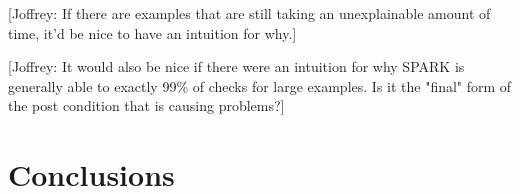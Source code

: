 \documentclass[runningheads]{llncs}
\begin{document}
[Joffrey: If there are examples that are still taking an unexplainable amount of time, it'd be nice to have an intuition for why.]

[Joffrey: It would also be nice if there were an intuition for why SPARK is generally able to exactly 99\% of checks for large examples. Is it the "final" form of the post condition that is causing problems?]


\section{Conclusions}
\label{sec:conclusions}

%
%
%
\newpage


\end{document}
